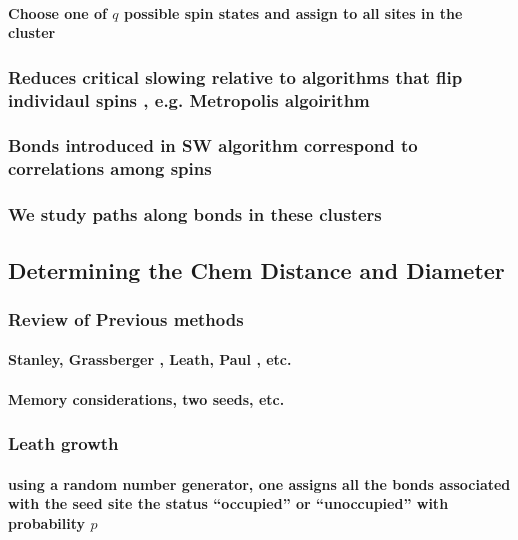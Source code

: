 \documentclass{umthesis}
\begin{document}
\paragraph{Choose one of $q$ possible spin states and assign to all sites in the cluster}
\label{sec-3.2.1.3.3}
\subsubsection{Reduces critical slowing relative to algorithms that flip individaul spins \cite{NeBa99}, e.g. Metropolis algoirithm \cite{Met}}
\label{sec-3.2.1.4}
\subsubsection{Bonds introduced in SW algorithm correspond to correlations among spins}
\label{sec-3.2.1.5}
\subsubsection{We study paths along bonds in these clusters}
\label{sec-3.2.1.6}
\subsection{Determining the Chem Distance and Diameter}
\label{sec-3.2.2}
\subsubsection{Review of Previous methods}
\label{sec-3.2.2.1}
\paragraph{Stanley, Grassberger \cite{Gr99}, Leath, Paul \cite{Paul2001}, etc.}
\label{sec-3.2.2.1.1}
\paragraph{Memory considerations, two seeds, etc.}
\label{sec-3.2.2.1.2}
\subsubsection{Leath growth \cite{Leath}}
\label{sec-3.2.2.2}
\paragraph{using a random number generator, one assigns all the bonds associated with the seed site the status ``occupied'' or ``unoccupied'' with probability $p$}
\label{sec-3.2.2.2.1}
\end{document}
